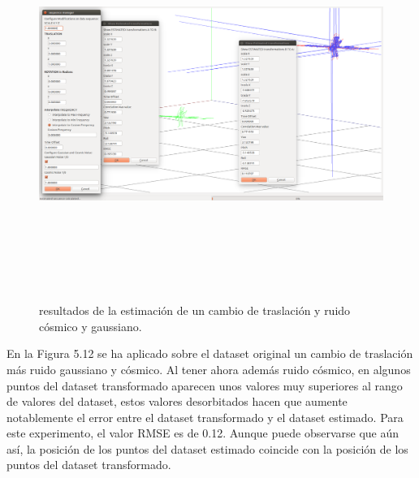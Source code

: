 \begin{figure}[h]
\begin{center}
\label{fig:opciones de View}\includegraphics[height=12.0cm,width=18.0cm]{img/cap6/Trasla_GaussianCosmicNoise_abba.png}
\hspace{0.5cm}

\end{center}

\caption{ resultados de la estimación de un cambio de traslación y ruido cósmico y gaussiano.}
\end{figure}
En la Figura 5.12 se ha aplicado sobre el dataset original un cambio de traslación más ruido gaussiano y cósmico. Al tener ahora además ruido cósmico, en algunos puntos del dataset transformado aparecen unos valores muy superiores al rango de valores del dataset, estos valores desorbitados hacen que aumente notablemente el error entre el dataset transformado y el dataset estimado. Para este experimento, el valor RMSE es de 0.12. Aunque puede observarse que aún así, la posición de los puntos del dataset estimado coincide con la posición de los puntos del dataset transformado.



